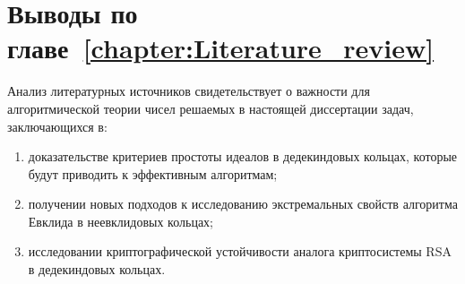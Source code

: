 \documentclass[_00_dissertation.tex]{subfiles}
\begin{document}
\section*{Выводы по главе~\ref{chapter:Literature_review}}

Анализ литературных источников свидетельствует о важности для алгоритмической теории чисел решаемых в настоящей диссертации задач, заключающихся в:
\begin{enumerate}
    \item доказательстве критериев простоты идеалов в дедекиндовых кольцах, которые будут приводить к эффективным алгоритмам;

    \item получении новых подходов к исследованию экстремальных свойств алгоритма Евклида в неевклидовых кольцах;

    \item исследовании криптографической устойчивости аналога криптосистемы RSA в дедекиндовых кольцах.
\end{enumerate}

\onlyinsubfile{
    
}
\end{document}
